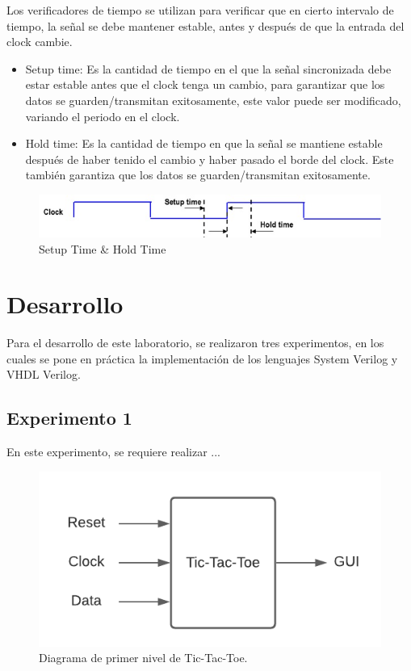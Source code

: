 \documentclass[journal,trans]{IEEEtran}
\begin{document}
	Los verificadores de tiempo se utilizan para verificar que en cierto intervalo de tiempo, la señal se debe mantener estable, antes y después de que la entrada del clock cambie.
	
	\vspace{10mm}
	
	\begin{itemize}
		\item Setup time: Es la cantidad de tiempo en el que la señal sincronizada debe estar estable antes que el clock tenga un cambio, para garantizar que los datos se guarden/transmitan exitosamente, este valor puede ser modificado, variando el periodo en el clock.
		\item Hold time: Es la cantidad de tiempo en que la señal se mantiene estable después de haber tenido el cambio y haber pasado el borde del clock. Este también garantiza que los datos se guarden/transmitan exitosamente. 
	\end{itemize}
	
	\begin{figure}[h]
		\centering
		\includegraphics[width=\linewidth]{./imagenes/setup_hold.jpg}
		\caption{Setup Time \& Hold Time}
		\label{fig:setup-time}
	\end{figure}
	
	\section{Desarrollo}
	Para el desarrollo de este laboratorio, se realizaron tres experimentos, en los cuales se pone en práctica la implementación de los lenguajes System Verilog y VHDL Verilog.
	
	\subsection{Experimento 1}
	En este experimento, se requiere realizar ...
	
	\begin{figure}[hbtp]
		\centering
		\includegraphics[width = \columnwidth]{imagenes/PrimerN.png}
		\caption[Figura1]{Diagrama de primer nivel de Tic-Tac-Toe.}
		\label{fig:PrimerN}
	\end{figure}
	
\end{document}
